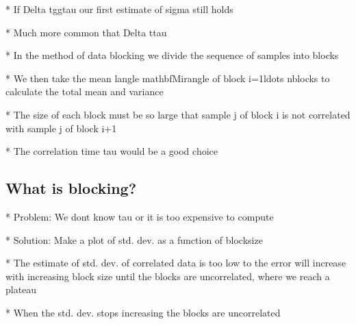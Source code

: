 \documentclass[letterpaper,10pt,english]{sphinxmanual}
\begin{document}
\begin{sphinxVerbatim}[commandchars=\\\{\}]
* If \PYGZdl{}\PYGZbs{}Delta t\PYGZbs{}gg\PYGZbs{}tau\PYGZdl{} our first estimate of \PYGZdl{}\PYGZbs{}sigma\PYGZdl{} still holds

* Much more common that \PYGZdl{}\PYGZbs{}Delta t\PYGZlt{}\PYGZbs{}tau\PYGZdl{}

* In the method of data blocking we divide the sequence of samples into blocks

* We then take the mean \PYGZdl{}\PYGZbs{}langle \PYGZbs{}mathbf\PYGZob{}M\PYGZcb{}\PYGZus{}i\PYGZbs{}rangle\PYGZdl{} of block \PYGZdl{}i=1\PYGZbs{}ldots n\PYGZus{}\PYGZob{}blocks\PYGZcb{}\PYGZdl{} to calculate the total mean and variance

* The size of each block must be so large that sample \PYGZdl{}j\PYGZdl{} of block \PYGZdl{}i\PYGZdl{} is not correlated with sample \PYGZdl{}j\PYGZdl{} of block \PYGZdl{}i+1\PYGZdl{}

* The correlation time \PYGZdl{}\PYGZbs{}tau\PYGZdl{} would be a good choice
\end{sphinxVerbatim}


\subsection{What is blocking?}
\label{\detokenize{chapter2:id18}}

\begin{sphinxVerbatim}[commandchars=\\\{\}]
* Problem: We don\PYGZsq{}t know \PYGZdl{}\PYGZbs{}tau\PYGZdl{} or it is too expensive to compute

* Solution: Make a plot of std. dev. as a function of blocksize

* The estimate of std. dev. of correlated data is too low \PYGZdl{}\PYGZbs{}to\PYGZdl{} the error will increase with increasing block size until the blocks are uncorrelated, where we reach a plateau

* When the std. dev. stops increasing the blocks are uncorrelated
\end{sphinxVerbatim}
\end{document}
